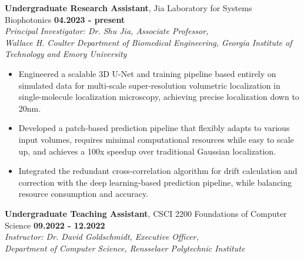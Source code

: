 \documentclass[letterpaper, 10pt]{article}
\newcommand{\subsectionvspace}{\vspace{6pt}}
\begin{document}
    \subsectionvspace

    \textbf{Undergraduate Research Assistant}, 
    Jia Laboratory for Systems Biophotonics \hfill \textbf{04.2023 - present} \\
    \textit{
        Principal Investigator: Dr. Shu Jia, 
        Associate Professor, \\
        Wallace H. Coulter Department of Biomedical Engineering,
        Georgia Institute of Technology and Emory University
    }
    \begin{itemize}
        \item Engineered a scalable 3D U-Net and training pipeline based entirely on simulated data for multi-scale super-resolution volumetric localization in single-molecule localization microscopy, achieving precise localization down to 20nm.
        \item Developed a patch-based prediction pipeline that flexibly adapts to various input volumes, requires minimal computational resources while easy to scale up, and achieves a 100x speedup over traditional Gaussian localization.
        \item Integrated the redundant cross-correlation algorithm for drift calculation and correction with the deep learning-based prediction pipeline, while balancing resource consumption and accuracy.
    \end{itemize}

    \subsectionvspace

    \textbf{Undergraduate Teaching Assistant}, 
    CSCI 2200 Foundations of Computer Science \hfill \textbf{09.2022 - 12.2022} \\
    \textit{
        Instructor: Dr. David Goldschmidt, 
        Executive Officer, \\
        Department of Computer Science, 
        Rensselaer Polytechnic Institute
    }
\end{document}
